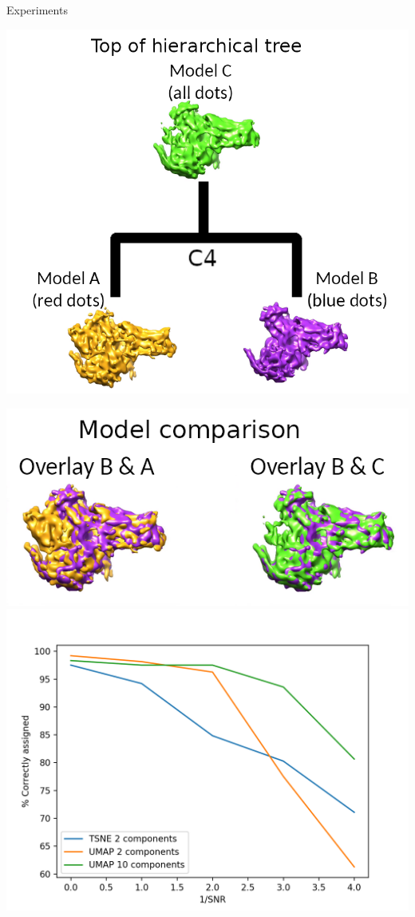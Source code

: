\documentclass[t, 11pt, xcolor=dvipsnames]{beamer}
\begin{document}
\begin{frame}{Experiments}
    \begin{center}
      \begin{minipage}{0.45\textwidth}
        \includegraphics[width=1\textwidth]{images/model_tree.png}
      \end{minipage}
      \begin{minipage}{0.45\textwidth}
        \includegraphics[width=1\textwidth]{images/model_comp.png}
        \pause
        \includegraphics[width=1\textwidth]{images/exp_plots.png}

\end{minipage}
\end{center}
\end{frame}
\end{document}
